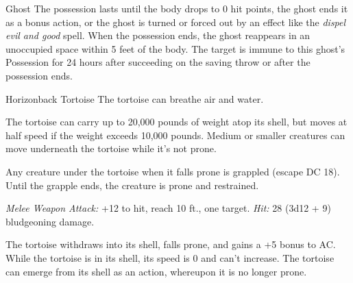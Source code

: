 \documentclass[10pt,a4paper,twoside,fancy,bg=print,twocolumn,openany,nodeprecatedcode]{dndbook}
\begin{document}
\begin{DndMonster}[float=t]{Ghost}
The possession lasts until the body drops to 0 hit points, the ghost ends it as a bonus action, or the ghost is turned or forced out by an effect like the \textit{dispel evil and good} spell. When the possession ends, the ghost reappears in an unoccupied space within 5 feet of the body. The target is immune to this ghost's Possession for 24 hours after succeeding on the saving throw or after the possession ends.

\end{DndMonster}



\begin{DndMonster}[float=t]{Horizonback Tortoise}
\DndMonsterBasics[
armor-class = {17 (natural armor) (22 while in its shell)},
hit-points = {\DndDice{13d20 + 91}},
speed = {20 ft.}
]
\DndMonsterAbilityScores[
 str = 28,
 dex = 3,
 con = 25,
 int = 4,
 wis = 10,
 cha = 5
]
\DndMonsterDetails[
saving-throws = {Str +12, Con +10},
damage-immunities = {poison},
senses = {darkvision 60 ft, passive perception 10},
languages = {understands Goblin but can't speak},
challenge = 8,
]
The tortoise can breathe air and water.

The tortoise can carry up to 20,000 pounds of weight atop its shell, but moves at half speed if the weight exceeds 10,000 pounds. Medium or smaller creatures can move underneath the tortoise while it's not prone.

Any creature under the tortoise when it falls prone is grappled (escape DC 18). Until the grapple ends, the creature is prone and restrained.

\textsl{Melee Weapon Attack:} +12 to hit, reach 10 ft., one target. \textsl{Hit:} 28 (3d12 + 9) bludgeoning damage.

The tortoise withdraws into its shell, falls prone, and gains a +5 bonus to AC. While the tortoise is in its shell, its speed is 0 and can't increase. The tortoise can emerge from its shell as an action, whereupon it is no longer prone.

\end{DndMonster}
\end{document}
